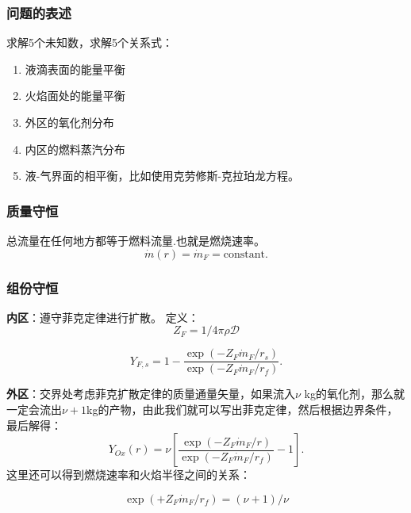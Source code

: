\subsubsection{问题的表述}
求解5个未知数，求解5个关系式：
\begin{enumerate}
    \item 液滴表面的能量平衡
    \item 火焰面处的能量平衡
    \item 外区的氧化剂分布
    \item 内区的燃料蒸汽分布
    \item 液-气界面的相平衡，比如使用克劳修斯-克拉珀龙方程。
\end{enumerate}

\subsubsection{质量守恒}
总流量在任何地方都等于燃料流量.也就是燃烧速率。
\begin{equation}
    {\dot{m}}(r)={\dot{m}}_{F}=\mathrm{constant}.
\end{equation}

\subsubsection{组份守恒}
\textbf{内区}：遵守菲克定律进行扩散。
定义：
\begin{equation}
    Z_F = 1/4\pi\rho\mathcal{D}
\end{equation}

\begin{equation}
    Y_{F,s}=1-\frac{\exp(-Z_{F}\dot{m}_{F}/r_{s})}{\exp(-Z_{F}\dot{m}_{F}/r_{f})}.
\end{equation}

\textbf{外区}：交界处考虑菲克扩散定律的质量通量矢量，如果流入\(\nu\) kg的氧化剂，那么就一定会流出\(\nu+1\)kg的产物，由此我们就可以写出菲克定律，然后根据边界条件，最后解得：
\begin{equation}
    Y_{O x}(r)=\nu\left[{\frac{\exp(-Z_{F}{\dot{m}}_{F}/r)}{\exp(-Z_{F}{\dot{m}}_{F}/r_{f})}}-1\right].
\end{equation}
这里还可以得到燃烧速率和火焰半径之间的关系：

\begin{equation}
    \exp(+Z_F\dot{m}_F/r_f)  = (\nu+1)/\nu
\end{equation}

